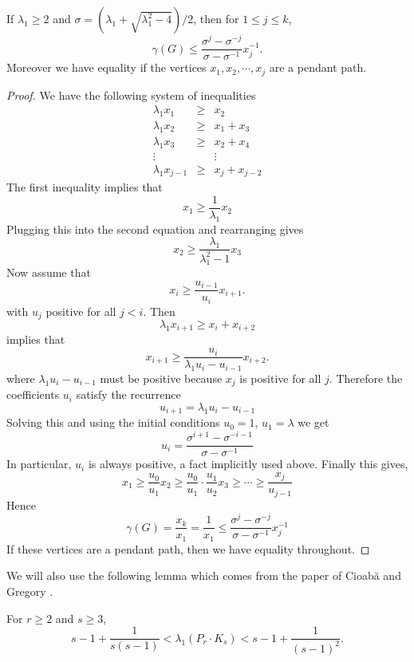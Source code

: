\begin{lemma}\label{path_bound}
  If $\lambda_1 \geq 2$ and $\sigma = (\lambda_1 + \sqrt{\lambda_1^2 - 4})/2$, then for
  $1 \leq j \leq k$,
   \[ \gamma(G) \leq \frac{\sigma^j - \sigma^{-j}}{\sigma - \sigma^{-1}} x_j^{-1}. \]
Moreover we have equality if the vertices $x_1, x_2, \cdots, x_{j}$ are a pendant path.
  
\end{lemma}
\begin{proof}
  We have the following system of inequalities
   \begin{eqnarray*}
     \lambda_1 x_1 & \geq & x_2 \\
     \lambda_1 x_2 & \geq & x_1 + x_3 \\
     \lambda_1 x_3 & \geq & x_2 + x_4 \\
     \vdots & & \vdots\\
     \lambda_1 x_{j-1} & \geq & x_j + x_{j-2}
   \end{eqnarray*}
 The first inequality implies that
  \[ x_1 \geq \frac{1}{\lambda_1} x_2\]
 Plugging this into the second equation and rearranging gives
  \[ x_2 \geq \frac{\lambda_1}{\lambda_1^2 - 1} x_3 \]
 Now assume that
  \[ x_i \geq \frac{u_{i-1}}{u_i} x_{i+1}. \]
 with $u_j$ positive for all $j<i$.  Then
  \[ \lambda_1 x_{i+1} \geq x_{i} + x_{i+2} \]
 implies that
  \[ x_{i+1} \geq \frac{u_i}{\lambda_1 u_i - u_{i-1}} x_{i+2}. \]
 where $\lambda_1 u_i - u_{i-1}$ must be positive because  $x_j$
 is positive for all $j$.
 Therefore the coefficients $u_i$ satisfy the recurrence
  \[ u_{i+1} = \lambda_1 u_i - u_{i-1}\]
 Solving this and using the initial conditions $u_0 = 1$,
 $u_1 = \lambda$ we get
  \[ u_i = \frac{\sigma^{i+1} - \sigma^{-i-1}}{\sigma - \sigma^{-1}} \]
 In particular, $u_i$ is always positive, a fact implicitly
 used above.  Finally this gives,
  \[ x_1 \geq \frac{u_0}{u_1} x_2 \geq \frac{u_0}{u_1} \cdot \frac{u_1}{u_2} x_3 \geq \cdots \geq \frac{x_j}{u_{j-1}} \]
 Hence
  \[ \gamma(G) = \frac{x_k}{x_1} = \frac{1}{x_1} \leq \frac{\sigma^j - \sigma^{-j}}{\sigma - \sigma^{-1}} x_j^{-1} \]
 If these vertices are a pendant path, then we have equality throughout.
\end{proof}

We will also use the following lemma which comes from the
paper of Cioab\u{a} and Gregory \cite{CioabaGregory2007}.

\begin{lemma}\label{kite_lambda}
  For $r \geq 2$ and $s \geq 3$,
   \[ s - 1 + \frac{1}{s(s-1)} < \lambda_1(P_r \cdot K_s) < s - 1 + \frac{1}{(s-1)^2} . \]
\end{lemma}

